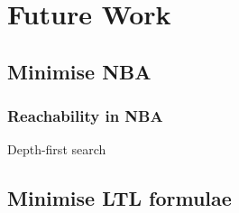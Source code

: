 \section{Future Work}
\subsection{Minimise NBA}
\cite{fritz2002state} \cite{hopcroft1971n} \cite{kan2016partial}
\subsubsection{Reachability in NBA}
Depth-first search
\subsection{Minimise LTL formulae}
